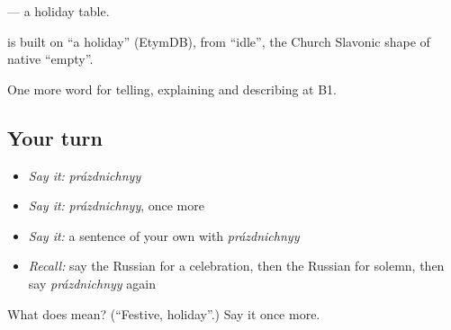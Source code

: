 \emph{ } — a holiday table.

\begin{cousinweb}
\emph{} is built on \emph{} \textquotedblleft{}a holiday\textquotedblright{} (EtymDB), from \emph{} \textquotedblleft{}idle\textquotedblright{}, the Church Slavonic shape of native \emph{} \textquotedblleft{}empty\textquotedblright{}.
\end{cousinweb}

\begin{grammarlens}[title={What you've built}]
One more word for telling, explaining and describing at B1.
\end{grammarlens}

\subsection*{Your turn}
\begin{itemize}
\raggedright
  \item \emph{Say it:} \emph{prázdnichnyy}
  \item \emph{Say it:} \emph{prázdnichnyy}, once more
  \item \emph{Say it:} a sentence of your own with \emph{prázdnichnyy}
  \item \emph{Recall:} say the Russian for a celebration, then the Russian for solemn, then say \emph{prázdnichnyy} again
\end{itemize}

\begin{tcolorbox}[breakable,colback=teal!4,colframe=teal!35!black,title={Before you move on}]
What does  mean? (\textquotedblleft{}Festive, holiday\textquotedblright{}.) Say it once more.
\end{tcolorbox}
